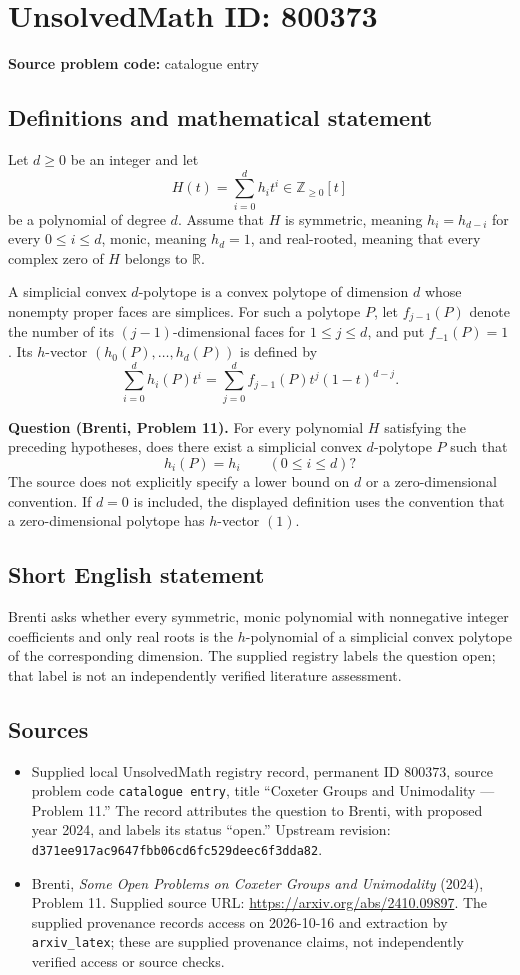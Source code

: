 \documentclass[11pt]{article}
\newcommand{\Z}{\mathbb{Z}}
\newcommand{\R}{\mathbb{R}}
\begin{document}
\section*{UnsolvedMath ID: 800373}
\textbf{Source problem code:} catalogue entry
\subsection{Definitions and mathematical statement}
Let \(d\geq 0\) be an integer and let
\[
H(t)=\sum_{i=0}^{d}h_i t^i\in\Z_{\geq 0}[t]
\]
be a polynomial of degree \(d\). Assume that \(H\) is symmetric, meaning \(h_i=h_{d-i}\) for every \(0\leq i\leq d\), monic, meaning \(h_d=1\), and real-rooted, meaning that every complex zero of \(H\) belongs to \(\R\).

A simplicial convex \(d\)-polytope is a convex polytope of dimension \(d\) whose nonempty proper faces are simplices. For such a polytope \(P\), let \(f_{j-1}(P)\) denote the number of its \((j-1)\)-dimensional faces for \(1\leq j\leq d\), and put \(f_{-1}(P)=1\). Its \(h\)-vector \((h_0(P),\ldots,h_d(P))\) is defined by
\[
\sum_{i=0}^{d}h_i(P)t^i
=
\sum_{j=0}^{d}f_{j-1}(P)t^j(1-t)^{d-j}.
\]

\textbf{Question (Brenti, Problem 11).} For every polynomial \(H\) satisfying the preceding hypotheses, does there exist a simplicial convex \(d\)-polytope \(P\) such that
\[
h_i(P)=h_i\qquad(0\leq i\leq d)?
\]
The source does not explicitly specify a lower bound on \(d\) or a zero-dimensional convention. If \(d=0\) is included, the displayed definition uses the convention that a zero-dimensional polytope has \(h\)-vector \((1)\).
\subsection{Short English statement}
Brenti asks whether every symmetric, monic polynomial with nonnegative integer coefficients and only real roots is the \(h\)-polynomial of a simplicial convex polytope of the corresponding dimension. The supplied registry labels the question open; that label is not an independently verified literature assessment.
\subsection{Sources}
\begin{itemize}
\item Supplied local UnsolvedMath registry record, permanent ID \(800373\), source problem code \texttt{catalogue entry}, title ``Coxeter Groups and Unimodality --- Problem 11.'' The record attributes the question to Brenti, with proposed year 2024, and labels its status ``open.'' Upstream revision: \texttt{d371ee917ac9647fbb06cd6fc529deec6f3dda82}.
\item Brenti, \emph{Some Open Problems on Coxeter Groups and Unimodality} (2024), Problem 11. Supplied source URL: \url{https://arxiv.org/abs/2410.09897}. The supplied provenance records access on 2026-10-16 and extraction by \texttt{arxiv\_latex}; these are supplied provenance claims, not independently verified access or source checks.
\end{itemize}
\end{document}
